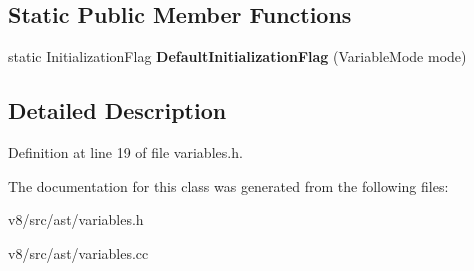 \subsection*{Static Public Member Functions}
\begin{DoxyCompactItemize}
\item 
\mbox{\label{classv8_1_1internal_1_1Variable_a9860b1e6e7174d96d6db2613f9ac0768}} 
static Initialization\+Flag {\bfseries Default\+Initialization\+Flag} (Variable\+Mode mode)
\end{DoxyCompactItemize}


\subsection{Detailed Description}


Definition at line 19 of file variables.\+h.



The documentation for this class was generated from the following files\+:\begin{DoxyCompactItemize}
\item 
v8/src/ast/variables.\+h\item 
v8/src/ast/variables.\+cc\end{DoxyCompactItemize}
